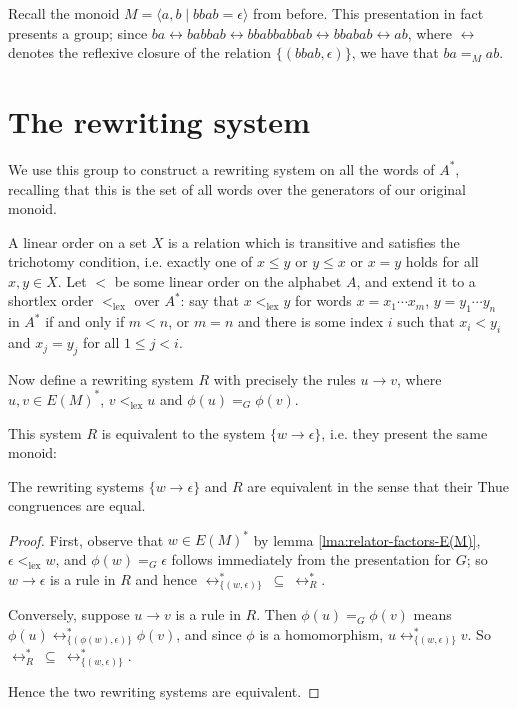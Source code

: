 \documentclass[libertine,widepage,nosubthm]{lmaths}
\newcommand{\ltlex}{<_{\mathrm{lex}}}
\begin{document}
\begin{example}
	Recall the monoid $M = \langle a, b \mid bbab = \epsilon \rangle$ from before. This presentation in fact presents a group; since $ba \leftrightarrow babbab \leftrightarrow bbabbabbab \leftrightarrow bbabab \leftrightarrow ab$, where $\leftrightarrow$ denotes the reflexive closure of the relation $\{(bbab, \epsilon)\}$, we have that $ba =_M ab$.
\end{example}

\section{The rewriting system}
We use this group to construct a rewriting system on all the words of $A^*$, recalling that this is the set of all words over the generators of our original monoid.

A linear order on a set $X$ is a relation which is transitive and satisfies the trichotomy condition, i.e. exactly one of $x \le y$ or $y \le x$ or $x = y$ holds for all $x, y \in X$. Let $<$ be some linear order on the alphabet $A$, and extend it to a shortlex order $\ltlex$ over $A^*$: say that $x \ltlex y$ for words $x = x_1\cdots x_m$, $y = y_1\cdots y_n$ in $A^*$ if and only if $m < n$, or $m = n$ and there is some index $i$ such that $x_i < y_i$ and $x_j = y_j$ for all $1 \le j < i$.

Now define a rewriting system $R$ with precisely the rules $u \to v$, where $u, v \in E(M)^*$, $v \ltlex u$ and $\phi(u) =_G \phi(v)$.

This system $R$ is equivalent to the system $\{w \to \epsilon\}$, i.e. they present the same monoid:

\begin{lemma} \label{lma:R-equivalent-to-pres}
	The rewriting systems $\{w \to \epsilon\}$ and $R$ are equivalent in the sense that their Thue congruences are equal.
\end{lemma}
\begin{proof}
First, observe that $w \in E(M)^*$ by lemma \ref{lma:relator-factors-E(M)}, $\epsilon \ltlex w$, and $\phi(w) =_G \epsilon$ follows immediately from the presentation for $G$; so $w \to \epsilon$ is a rule in $R$ and hence $\leftrightarrow^*_{\{(w,\epsilon)\}}\ \subseteq\ \leftrightarrow^*_R$.

Conversely, suppose $u \to v$ is a rule in $R$. Then $\phi(u) =_G \phi(v)$ means $\phi(u) \leftrightarrow^*_{\{(\phi(w), \epsilon)\}} \phi(v)$, and since $\phi$ is a homomorphism, $u \leftrightarrow^*_{\{(w, \epsilon)\}} v$. So $\leftrightarrow^*_R\ \subseteq\ \leftrightarrow^*_{\{(w,\epsilon)\}}$.

Hence the two rewriting systems are equivalent.
\end{proof}
\end{document}

